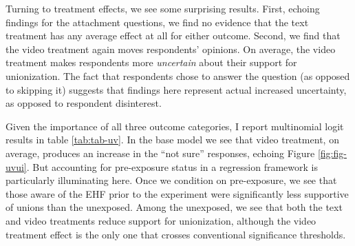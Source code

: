 \documentclass[
  11pt,
  oneside]{article}
\begin{document}
Turning to treatment effects, we see some surprising results. First, echoing findings for the attachment questions, we find no evidence that the text treatment has any average effect at all for either outcome. Second, we find that the video treatment again moves respondents' opinions. On average, the video treatment makes respondents more \emph{uncertain} about their support for unionization. The fact that respondents chose to answer the question (as opposed to skipping it) suggests that findings here represent actual increased uncertainty, as opposed to respondent disinterest.

Given the importance of all three outcome categories, I report multinomial logit results in table \ref{tab:tab-uv}. In the base model we see that video treatment, on average, produces an increase in the ``not sure'' responses, echoing Figure \ref{fig:fig-uvui}. But accounting for pre-exposure status in a regression framework is particularly illuminating here. Once we condition on pre-exposure, we see that those aware of the EHF prior to the experiment were significantly less supportive of unions than the unexposed. Among the unexposed, we see that both the text and video treatments reduce support for unionization, although the video treatment effect is the only one that crosses conventional significance thresholds.
\end{document}
